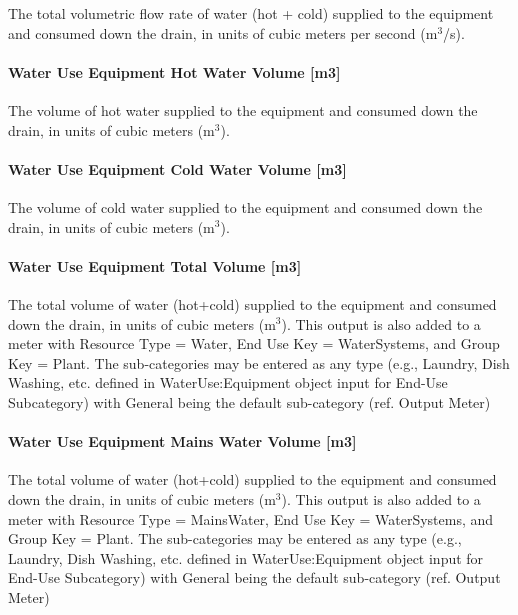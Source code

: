 The total volumetric flow rate of water (hot + cold) supplied to the equipment and consumed down the drain, in units of cubic meters per second (m\(^{3}\)/s).

\paragraph{Water Use Equipment Hot Water Volume {[}m3{]}}\label{water-use-equipment-hot-water-volume-m3}

The volume of hot water supplied to the equipment and consumed down the drain, in units of cubic meters (m\(^{3}\)).

\paragraph{Water Use Equipment Cold Water Volume {[}m3{]}}\label{water-use-equipment-cold-water-volume-m3}

The volume of cold water supplied to the equipment and consumed down the drain, in units of cubic meters (m\(^{3}\)).

\paragraph{Water Use Equipment Total Volume {[}m3{]}}\label{water-use-equipment-total-volume-m3}

The total volume of water (hot+cold) supplied to the equipment and consumed down the drain, in units of cubic meters (m\(^{3}\)). This output is also added to a meter with Resource Type = Water, End Use Key = WaterSystems, and Group Key = Plant. The sub-categories may be entered as any type (e.g., Laundry, Dish Washing, etc. defined in WaterUse:Equipment object input for End-Use Subcategory) with General being the default sub-category (ref. Output Meter)

\paragraph{Water Use Equipment Mains Water Volume {[}m3{]}}\label{water-use-equipment-mains-water-volume-m3}

The total volume of water (hot+cold) supplied to the equipment and consumed down the drain, in units of cubic meters (m\(^{3}\)). This output is also added to a meter with Resource Type = MainsWater, End Use Key = WaterSystems, and Group Key = Plant. The sub-categories may be entered as any type (e.g., Laundry, Dish Washing, etc. defined in WaterUse:Equipment object input for End-Use Subcategory) with General being the default sub-category (ref. Output Meter)

